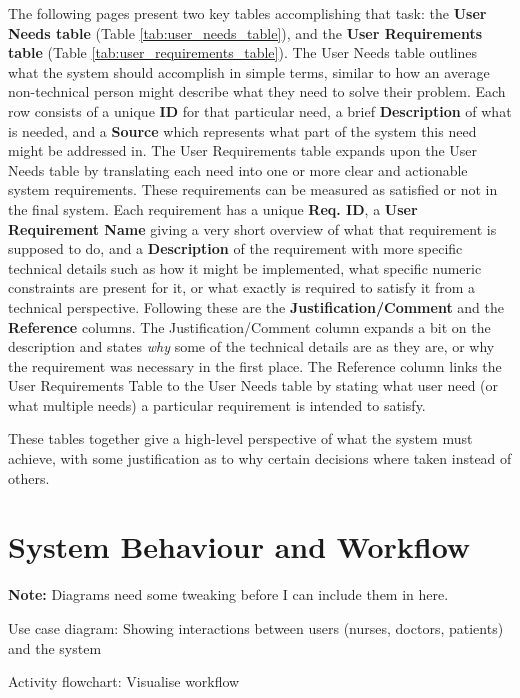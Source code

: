 The following pages present two key tables accomplishing that task: the \textbf{User Needs table} (Table \ref{tab:user_needs_table}), and the \textbf{User Requirements table} (Table \ref{tab:user_requirements_table}). The User Needs table outlines what the system should accomplish in simple terms, similar to how an average non-technical person might describe what they need to solve their problem. Each row consists of a unique \textbf{ID} for that particular need, a brief \textbf{Description} of what is needed, and a \textbf{Source} which represents what part of the system this need might be addressed in. The User Requirements table expands upon the User Needs table by translating each need into one or more clear and actionable system requirements. These requirements can be measured as satisfied or not in the final system. Each requirement has a unique \textbf{Req. ID}, a \textbf{User Requirement Name} giving a very short overview of what that requirement is supposed to do, and a \textbf{Description} of the requirement with more specific technical details such as how it might be implemented, what specific numeric constraints are present for it, or what exactly is required to satisfy it from a technical perspective. Following these are the \textbf{Justification/Comment} and the \textbf{Reference} columns. The Justification/Comment column expands a bit on the description and states \textit{why} some of the technical details are as they are, or why the requirement was necessary in the first place. The Reference column links the User Requirements Table to the User Needs table by stating what user need (or what multiple needs) a particular requirement is intended to satisfy.

These tables together give a high-level perspective of what the system must achieve, with some justification as to why certain decisions where taken instead of others.


\clearpage

\clearpage

\section{System Behaviour and Workflow} %
\textbf{Note:} Diagrams need some tweaking before I can include them in here.

Use case diagram: Showing interactions between users (nurses, doctors, patients) and the system

Activity flowchart: Visualise workflow

